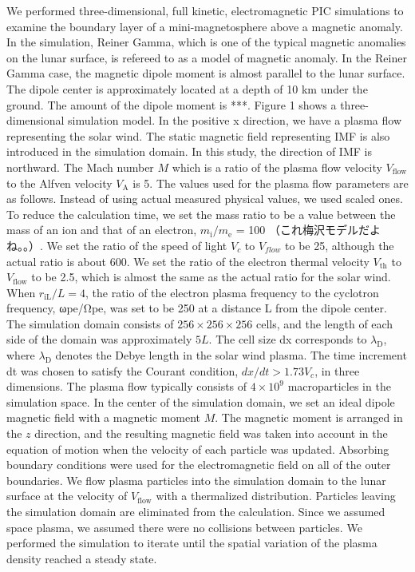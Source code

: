 \documentclass{EPS}
\begin{document}
We performed three-dimensional, full kinetic, electromagnetic PIC simulations to 
examine the boundary layer of a mini-magnetosphere above a magnetic anomaly. 
In the simulation, Reiner Gamma, which is one of the typical magnetic anomalies on the lunar surface, 
is refereed to as a model of magnetic anomaly. 
In the Reiner Gamma case, the magnetic dipole moment is almost parallel to the lunar surface. 
The dipole center is approximately located at a depth of 10 km under the ground. 
The amount of the dipole moment is ***.
Figure 1 shows a three-dimensional simulation model. In the positive x direction, 
we have a plasma flow representing the solar wind. 
The static magnetic field representing IMF is also introduced in the simulation domain. 
In this study, the direction of IMF is northward. 
The Mach number $M$ which is a ratio of the plasma flow velocity $V_\mathrm{flow}$ to the Alfven velocity $V_\mathrm{A}$ is 5. 
The values used for the plasma flow parameters are as follows. 
Instead of using actual measured physical values, we used scaled ones. 
To reduce the calculation time, we set the mass ratio to be a value between the mass of an ion and that of an electron, 
$ m_\mathrm{i}/ m_\mathrm{e}$ = 100 （これ梅沢モデルだよね。。）. 
We set the ratio of the speed of light $V_c$ to $ V_{flow}$ to be 25, although the actual ratio is about 600. 
We set the ratio of the electron thermal velocity $V_\mathrm{th}$ to $V_\mathrm{flow}$ to be 2.5, 
which is almost the same as the actual ratio for the solar wind. 
When $ r_\mathrm{iL} /L = 4$, the ratio of the electron plasma frequency to the cyclotron frequency, 
ωpe/Ωpe, was set to be 250 at a distance L from the dipole center. 
The simulation domain consists of $256 \times 256 \times 256$ cells, and the length of each side of 
the domain was approximately $5L$. 
The cell size dx corresponds to $\lambda_\mathrm{D}$, where $\lambda_\mathrm{D}$ 
denotes the Debye length in the solar wind plasma.
The time increment dt was chosen to satisfy the Courant condition, $dx/dt > 1.73 V_c $, in three dimensions. 
The plasma flow typically consists of $4 \times 10^9 $ macroparticles in the simulation space. 
In the center of the simulation domain, we set an ideal dipole magnetic field with a magnetic moment $M$. 
The magnetic moment is arranged in the $z$ direction, and the resulting magnetic field was taken into account in the equation of motion when the velocity of each particle was updated. 
Absorbing boundary conditions were used for the electromagnetic field on all of the outer boundaries. 
We flow plasma particles into the simulation domain to the lunar surface at the velocity of $V_\mathrm{flow}$
with a thermalized distribution. Particles leaving the simulation domain are eliminated from the calculation. 
Since we assumed space plasma, we assumed there were no collisions between particles. 
We performed the simulation to iterate until the spatial variation of the plasma density reached a steady state. 
\end{document}
